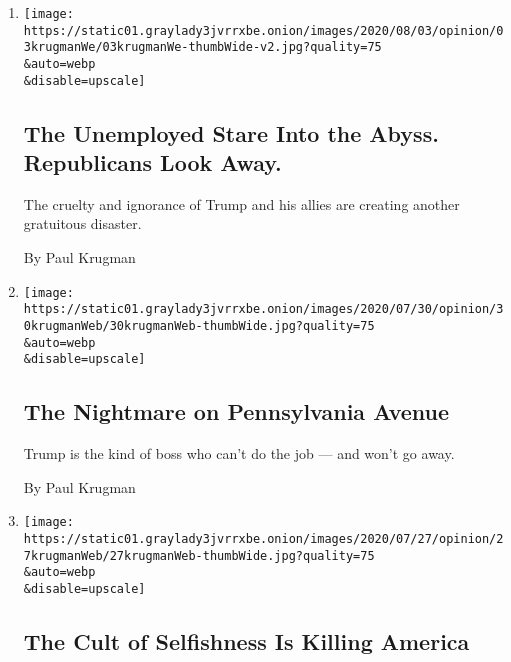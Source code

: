 \begin{enumerate}
\def\labelenumi{\arabic{enumi}.}
\item
  \href{/2020/08/03/opinion/republicans-unemployed-coronavirus.html}{}

  \texttt{[image: https://static01.graylady3jvrrxbe.onion/images/2020/08/03/opinion/03krugmanWe/03krugmanWe-thumbWide-v2.jpg?quality=75\\\&auto=webp\\\&disable=upscale]}

  \hypertarget{the-unemployed-stare-into-the-abyss-republicans-look-away}{%
  \subsection{The Unemployed Stare Into the Abyss. Republicans Look
  Away.}\label{the-unemployed-stare-into-the-abyss-republicans-look-away}}

  The cruelty and ignorance of Trump and his allies are creating another
  gratuitous disaster.

  By Paul Krugman
\item
  \href{/2020/07/30/opinion/trump-coronavirus-economy.html}{}

  \texttt{[image: https://static01.graylady3jvrrxbe.onion/images/2020/07/30/opinion/30krugmanWeb/30krugmanWeb-thumbWide.jpg?quality=75\\\&auto=webp\\\&disable=upscale]}

  \hypertarget{the-nightmare-on-pennsylvania-avenue}{%
  \subsection{The Nightmare on Pennsylvania
  Avenue}\label{the-nightmare-on-pennsylvania-avenue}}

  Trump is the kind of boss who can't do the job --- and won't go away.

  By Paul Krugman
\item
  \href{/2020/07/27/opinion/us-republicans-coronavirus.html}{}

  \texttt{[image: https://static01.graylady3jvrrxbe.onion/images/2020/07/27/opinion/27krugmanWeb/27krugmanWeb-thumbWide.jpg?quality=75\\\&auto=webp\\\&disable=upscale]}

  \hypertarget{the-cult-of-selfishness-is-killing-america}{%
  \subsection{The Cult of Selfishness Is Killing
  America}\label{the-cult-of-selfishness-is-killing-america}}


\end{enumerate}
